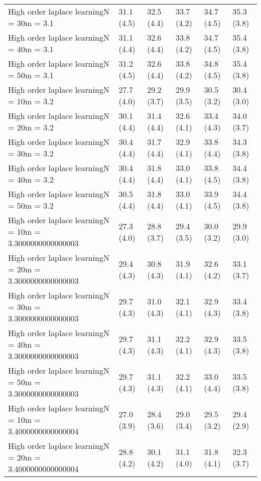 \documentclass{article}
\begin{document}
\begin{table*}[t!]
\begin{center}
\begin{small}
\begin{sc}
\begin{tabular}{llllll}
High order laplace learningN = 30m = 3.1&31.1 (4.5)      &32.5 (4.4)      &33.7 (4.2)      &34.7 (4.5)      &35.3 (3.8)      \\
High order laplace learningN = 40m = 3.1&31.1 (4.4)      &32.6 (4.4)      &33.8 (4.2)      &34.7 (4.5)      &35.4 (3.8)      \\
High order laplace learningN = 50m = 3.1&31.2 (4.5)      &32.6 (4.4)      &33.8 (4.2)      &34.8 (4.5)      &35.4 (3.8)      \\
High order laplace learningN = 10m = 3.2&27.7 (4.0)      &29.2 (3.7)      &29.9 (3.5)      &30.5 (3.2)      &30.4 (3.0)      \\
High order laplace learningN = 20m = 3.2&30.1 (4.4)      &31.4 (4.4)      &32.6 (4.1)      &33.4 (4.3)      &34.0 (3.7)      \\
High order laplace learningN = 30m = 3.2&30.4 (4.4)      &31.7 (4.4)      &32.9 (4.1)      &33.8 (4.4)      &34.3 (3.8)      \\
High order laplace learningN = 40m = 3.2&30.4 (4.4)      &31.8 (4.4)      &33.0 (4.1)      &33.8 (4.5)      &34.4 (3.8)      \\
High order laplace learningN = 50m = 3.2&30.5 (4.4)      &31.8 (4.4)      &33.0 (4.1)      &33.9 (4.5)      &34.4 (3.8)      \\
High order laplace learningN = 10m = 3.3000000000000003&27.3 (4.0)      &28.8 (3.7)      &29.4 (3.5)      &30.0 (3.2)      &29.9 (3.0)      \\
High order laplace learningN = 20m = 3.3000000000000003&29.4 (4.3)      &30.8 (4.3)      &31.9 (4.1)      &32.6 (4.2)      &33.1 (3.7)      \\
High order laplace learningN = 30m = 3.3000000000000003&29.7 (4.3)      &31.0 (4.3)      &32.1 (4.1)      &32.9 (4.3)      &33.4 (3.8)      \\
High order laplace learningN = 40m = 3.3000000000000003&29.7 (4.3)      &31.1 (4.3)      &32.2 (4.1)      &32.9 (4.3)      &33.5 (3.8)      \\
High order laplace learningN = 50m = 3.3000000000000003&29.7 (4.3)      &31.1 (4.3)      &32.2 (4.1)      &33.0 (4.4)      &33.5 (3.8)      \\
High order laplace learningN = 10m = 3.4000000000000004&27.0 (3.9)      &28.4 (3.6)      &29.0 (3.4)      &29.5 (3.2)      &29.4 (2.9)      \\
High order laplace learningN = 20m = 3.4000000000000004&28.8 (4.2)      &30.1 (4.2)      &31.1 (4.0)      &31.8 (4.1)      &32.3 (3.7)      \\

\end{tabular}
\end{sc}
\end{small}
\end{center}
\end{table*}
\end{document}
